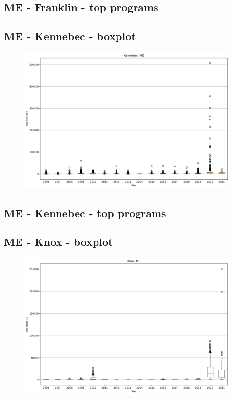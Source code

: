 \subsection*{ME - Franklin - top programs}

\newpage
\subsection*{ME - Kennebec - boxplot}
\begin{figure}[h]
\centering
\includegraphics[width=7in]{../output/boxplots/counties/Kennebec-ME_boxplot.png}
\end{figure}


\subsection*{ME - Kennebec - top programs}

\newpage
\subsection*{ME - Knox - boxplot}
\begin{figure}[h]
\centering
\includegraphics[width=7in]{../output/boxplots/counties/Knox-ME_boxplot.png}
\end{figure}


